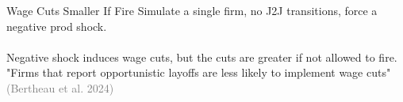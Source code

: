 \documentclass[9pt,aspectratio=169]{beamer} %
\begin{document}
\begin{frame}{Wage Cuts Smaller If Fire}
Simulate a single firm, no J2J transitions, force a negative prod shock. \\
\\
Negative shock induces wage cuts, but the cuts are greater if not allowed to fire. \\
"Firms that report opportunistic layoffs are less likely to implement wage cuts" \textcolor{gray}{(Bertheau et al. 2024)}
\end{frame}
\end{document}
